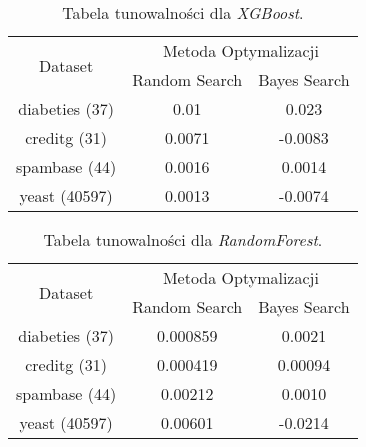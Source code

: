 \documentclass[a4paper,11pt]{article}
\begin{document}
\begin{table}[H]
\centering
\begin{tabular}{|c|c|c|}
\hline
\multirow{2}{*}{Dataset} & \multicolumn{2}{c|}{Metoda Optymalizacji} \\ \cline{2-3} 
                         & Random Search & Bayes Search \\ \hline
diabeties (37)               & 0.01       & 0.023       \\ \hline
creditg (31)               & 0.0071     & -0.0083       \\ \hline
spambase (44)               & 0.0016       & 0.0014      \\ \hline
yeast (40597)            & 0.0013      & -0.0074      \\ \hline
\end{tabular}
\vspace{1ex}
\caption{Tabela tunowalności dla \textit{XGBoost}.}
\label{tab:results}
\end{table}


\begin{table}[H]
\centering
\begin{tabular}{|c|c|c|}
\hline
\multirow{2}{*}{Dataset} & \multicolumn{2}{c|}{Metoda Optymalizacji} \\ \cline{2-3} 
                         & Random Search & Bayes Search \\ \hline
diabeties (37)               & 0.000859     & 0.0021       \\ \hline
creditg (31)               & 0.000419     & 0.00094       \\ \hline
spambase (44)               & 0.00212       & 0.0010      \\ \hline
yeast (40597)            & 0.00601      & -0.0214      \\ \hline
\end{tabular}
\vspace{1ex}
\caption{Tabela tunowalności dla \textit{RandomForest}.}
\label{tab:results}
\end{table}
\end{document}
